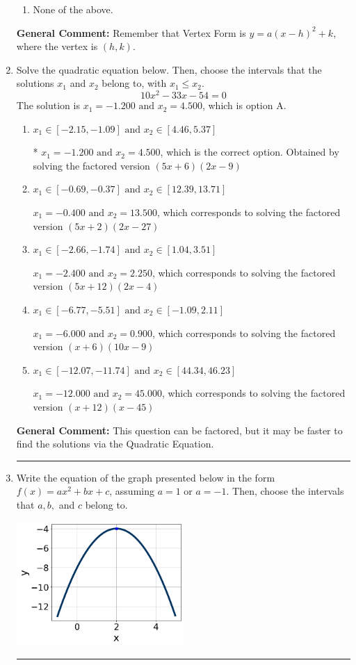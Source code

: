 \documentclass{extbook}[14pt]
\newcommand{\litem}[1]{\item #1

\rule{\textwidth}{0.4pt}}
\begin{document}
\begin{enumerate}
{\begin{enumerate}[label=\Alph*.]
\begin{multicols}{2}
\end{multicols}\item None of the above.\end{enumerate}
\textbf{General Comment:} Remember that Vertex Form is $y = a(x-h)^2+k$, where the vertex is $(h, k)$.
}
\litem{
Solve the quadratic equation below. Then, choose the intervals that the solutions $x_1$ and $x_2$ belong to, with $x_1 \leq x_2$.
\[ 10x^{2} -33 x -54 = 0 \]The solution is \( x_1 = -1.200 \text{ and } x_2 = 4.500 \), which is option A.\begin{enumerate}[label=\Alph*.]
\item \( x_1 \in [-2.15, -1.09] \text{ and } x_2 \in [4.46, 5.37] \)

* $x_1 = -1.200 \text{ and } x_2 = 4.500$, which is the correct option. Obtained by solving the factored version $(5x + 6)(2x -9)$
\item \( x_1 \in [-0.69, -0.37] \text{ and } x_2 \in [12.39, 13.71] \)

$x_1 = -0.400 \text{ and } x_2 = 13.500$, which corresponds to solving the factored version $(5x + 2)(2x -27)$
\item \( x_1 \in [-2.66, -1.74] \text{ and } x_2 \in [1.04, 3.51] \)

$x_1 = -2.400 \text{ and } x_2 = 2.250$, which corresponds to solving the factored version $(5x + 12)(2x -4)$
\item \( x_1 \in [-6.77, -5.51] \text{ and } x_2 \in [-1.09, 2.11] \)

$x_1 = -6.000 \text{ and } x_2 = 0.900$, which corresponds to solving the factored version $(x + 6)(10x -9)$
\item \( x_1 \in [-12.07, -11.74] \text{ and } x_2 \in [44.34, 46.23] \)

$x_1 = -12.000 \text{ and } x_2 = 45.000$, which corresponds to solving the factored version $(x + 12)(x -45)$
\end{enumerate}

\textbf{General Comment:} This question can be factored, but it may be faster to find the solutions via the Quadratic Equation.
}
\litem{
Write the equation of the graph presented below in the form $f(x)=ax^2+bx+c$, assuming  $a=1$ or $a=-1$. Then, choose the intervals that $a, b,$ and $c$ belong to.

\begin{center}
    \includegraphics[width=0.5\textwidth]{../Figures/quadraticGraphToEquationA.png}
\end{center}


}
\end{enumerate}
\end{document}
